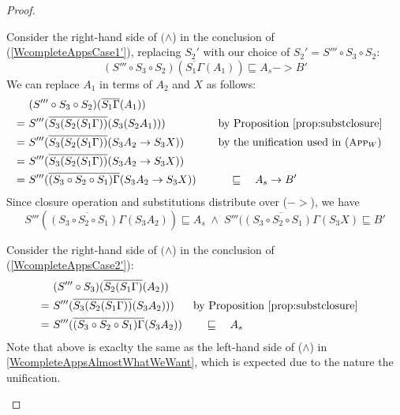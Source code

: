 \begin{proof}
\begin{itemize}
        Consider the right-hand side of $(\land$) in
        the conclusion of (\ref{WcompleteAppsCase1'}), replacing $S_2'$ with
        our choice of $S_2' = S'''\circ S_3\circ S_2$:
        \[ (S'''\circ S_3\circ S_2)(\overline{S_1\Gamma}(A_1))
        \sqsubseteq A_s -> B' \]
        We can replace $A_1$ in terms of $A_2$ and $X$ as follows:
        \begin{align*}
          & (S'''\circ S_3\circ S_2)(\overline{S_1\Gamma}(A_1))
                \\
        =~& S'''(\overline{S_3(S_2(S_1\Gamma))}(S_3(S_2 A_1)))
        &\quad& \text{by Proposition \ref{prop:substclosure}}
        \\
        =~& S'''(\overline{S_3(S_2(S_1\Gamma))}(S_3 A_2 -> S_3 X))
        &\quad& \text{by the unification used in ({\small\sc App$_W$})}
        \\
        =~& S'''(\overline{S_3(S_2(S_1\Gamma))}(S_3 A_2 -> S_3 X)) \\
        =~& S'''(\overline{(S_3\circ S_2 \circ S_1)\Gamma}(S_3 A_2 -> S_3 X))
        &\quad& \quad\sqsubseteq\quad A_s -> B'
        \end{align*}
        Since closure operation and substitutions distribute over ($->$),
        we have
        \begin{equation}
                S'''(\overline{(S_3\circ S_2 \circ S_1)\Gamma}(S_3 A_2)) \sqsubseteq A_s
                \;\land\;
                S'''(\overline{(S_3\circ S_2 \circ S_1)\Gamma}(S_3 X) \sqsubseteq B'
                \label{WcompleteAppsAlmostWhatWeWant}
        \end{equation}

        Consider the right-hand side of $(\land$) in
        the conclusion of (\ref{WcompleteAppsCase2'}):
        \begin{align*}
          & (S'''\circ S_3)(\overline{S_2(S_1\Gamma)}(A_2))
                \\
        =~& S'''(\overline{S_3(S_2(S_1\Gamma))}(S_3 A_2)))
        && \text{by Proposition \ref{prop:substclosure}}
                \\
        =~& S'''(\overline{(S_3\circ S_2 \circ S_1)\Gamma}(S_3 A_2))
                && \quad\sqsubseteq\quad A_s
        \end{align*}
        Note that above is exaclty the same as the left-hand side of ($\land$)
        in \ref{WcompleteAppsAlmostWhatWeWant}, which is expected due to
        the nature the unification.


\end{itemize}
\end{proof}
